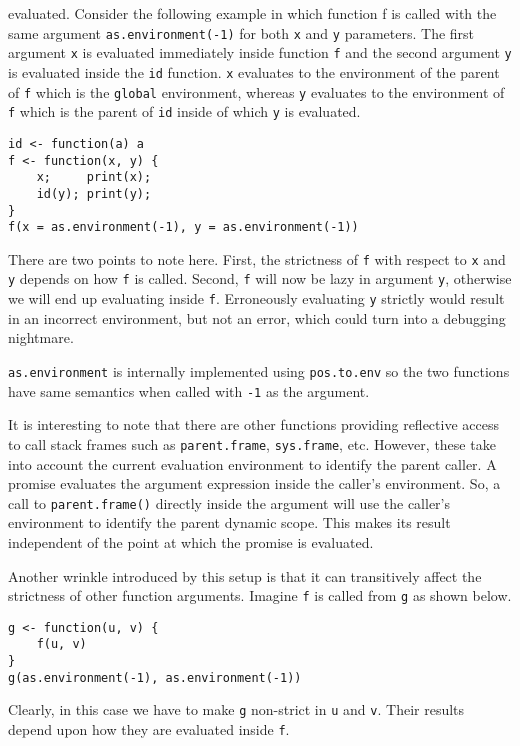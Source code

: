 \documentclass[screen,acmsmall]{acmart}
\newcommand{\code}[1]{\lstinline[style=R]|#1|\xspace}
\begin{document}
evaluated. Consider the following example in which function f is called with the
same argument \code{as.environment(-1)} for both \code{x} and \code{y}
parameters. The first argument \code{x} is evaluated immediately inside
function \code{f} and the second argument \code{y} is evaluated inside the
\code{id} function. \code{x} evaluates to the environment of the parent of
\code{f} which is the \code{global} environment, whereas \code{y} evaluates to
the environment of \code{f} which is the parent of \code{id} inside of which
\code{y} is evaluated.

\begin{lstlisting}
id <- function(a) a
f <- function(x, y) {
    x;     print(x);
    id(y); print(y);
}
f(x = as.environment(-1), y = as.environment(-1))
\end{lstlisting}

There are two points to note here. First, the strictness of \code{f} with
respect to \code{x} and \code{y} depends on how \code{f} is called. Second,
\code{f} will now be lazy in argument \code{y}, otherwise we will end up
evaluating inside \code{f}. Erroneously evaluating \code{y} strictly would
result in an incorrect environment, but not an error, which could turn into a
debugging nightmare.

\code{as.environment} is internally implemented using \code{pos.to.env} so the
two functions have same semantics when called with \code{-1} as the argument.

It is interesting to note that there are other functions providing reflective
access to call stack frames such as \code{parent.frame}, \code{sys.frame}, etc.
However, these take into account the current evaluation environment to identify
the parent caller. A promise evaluates the argument expression inside the
caller's environment. So, a call to \code{parent.frame()} directly inside the
argument will use the caller's environment to identify the parent dynamic scope.
This makes its result independent of the point at which the promise is
evaluated.

Another wrinkle introduced by this setup is that it can transitively affect the
strictness of other function arguments. Imagine \code{f} is called from \code{g}
as shown below.

\begin{lstlisting}
g <- function(u, v) {
    f(u, v)
}
g(as.environment(-1), as.environment(-1))
\end{lstlisting}

Clearly, in this case we have to make \code{g} non-strict in \code{u} and
\code{v}. Their results depend upon how they are evaluated inside \code{f}.
\end{document}
